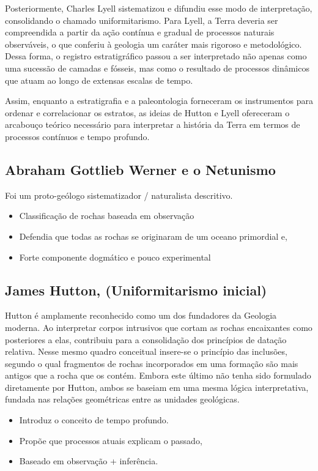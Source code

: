 \documentclass[a4paper,12pt]{article}
\theoremstyle{definition}
\theoremstyle{definition}
\theoremstyle{definition}
\begin{document}
Posteriormente, Charles Lyell sistematizou e difundiu esse modo de interpretação, consolidando o chamado uniformitarismo. Para Lyell, a Terra deveria ser compreendida a partir da ação contínua e gradual de processos naturais observáveis, o que conferiu à geologia um caráter mais rigoroso e metodológico. Dessa forma, o registro estratigráfico passou a ser interpretado não apenas como uma sucessão de camadas e fósseis, mas como o resultado de processos dinâmicos que atuam ao longo de extensas escalas de tempo.

Assim, enquanto a estratigrafia e a paleontologia forneceram os instrumentos para ordenar e correlacionar os estratos, as ideias de Hutton e Lyell ofereceram o arcabouço teórico necessário para interpretar a história da Terra em termos de processos contínuos e tempo profundo.

\subsection{Abraham Gottlieb Werner e o Netunismo}

Foi um proto-geólogo sistematizador / naturalista descritivo.

\begin{itemize}[label=\diamond]
    \item Classificação de rochas baseada em observação
    \item Defendia que todas as rochas se originaram de um oceano primordial e,
    \item Forte componente dogmático e pouco experimental
\end{itemize}

\subsection{James Hutton, (Uniformitarismo inicial)}

Hutton é amplamente reconhecido como um dos fundadores da Geologia moderna. Ao interpretar corpos intrusivos que cortam as rochas encaixantes como posteriores a elas, contribuiu para a consolidação dos princípios de datação relativa. Nesse mesmo quadro conceitual insere-se o princípio das inclusões, segundo o qual fragmentos de rochas incorporados em uma formação são mais antigos que a rocha que os contém. Embora este último não tenha sido formulado diretamente por Hutton, ambos se baseiam em uma mesma lógica interpretativa, fundada nas relações geométricas entre as unidades geológicas.

\begin{itemize}[label=\diamond]
    \item Introduz o conceito de tempo profundo.
    \item Propõe que processos atuais explicam o passado,
    \item Baseado em observação + inferência.
\end{itemize}
\end{document}

